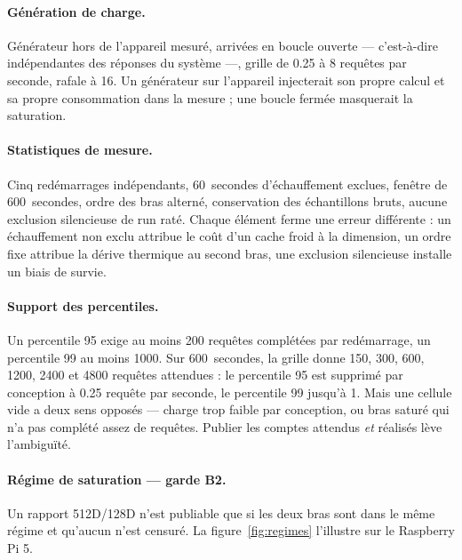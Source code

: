 \documentclass[11pt,a4paper]{article}
\begin{document}
\paragraph{Génération de charge.} Générateur hors de l'appareil mesuré, arrivées en
boucle ouverte — c'est-à-dire indépendantes des réponses du système —, grille de
\num{0,25} à 8 requêtes par seconde, rafale à 16. Un générateur sur l'appareil
injecterait son propre calcul et sa propre consommation dans la mesure ; une boucle
fermée masquerait la saturation.

\paragraph{Statistiques de mesure.} Cinq redémarrages indépendants, 60~secondes
d'échauffement exclues, fenêtre de 600~secondes, ordre des bras alterné, conservation
des échantillons bruts, aucune exclusion silencieuse de run raté. Chaque élément
ferme une erreur différente : un échauffement non exclu attribue le coût d'un cache
froid à la dimension, un ordre fixe attribue la dérive thermique au second bras, une
exclusion silencieuse installe un biais de survie.

\paragraph{Support des percentiles.} Un percentile 95 exige au moins 200 requêtes
complétées par redémarrage, un percentile 99 au moins \num{1000}. Sur 600~secondes,
la grille donne 150, 300, 600, \num{1200}, \num{2400} et \num{4800} requêtes attendues :
le percentile 95 est supprimé par conception à \num{0,25} requête par seconde, le
percentile 99 jusqu'à 1. Mais une cellule vide a deux sens opposés — charge trop
faible par conception, ou bras saturé qui n'a pas complété assez de requêtes. Publier
les comptes attendus \emph{et} réalisés lève l'ambiguïté.

\paragraph{Régime de saturation — garde B2.} Un rapport 512D/128D n'est publiable que
si les deux bras sont dans le même régime et qu'aucun n'est censuré. La
figure~\ref{fig:regimes} l'illustre sur le Raspberry Pi 5.
\end{document}
